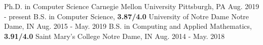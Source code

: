 \begin{cventries}
  \education
    {Ph.D. in Computer Science}
    {Carnegie Mellon University}
    {Pittsburgh, PA}
    {Aug. 2019 - present}
  \education
    {B.S. in Computer Science, \textbf{3.87/4.0}}
    {University of Notre Dame}
    {Notre Dame, IN}
    {Aug. 2015 - May. 2019}
  \education
    {B.S. in Computing and Applied Mathematics, \textbf{3.91/4.0}}
    {Saint Mary's College}
    {Notre Dame, IN}
    {Aug. 2014 - May. 2018}
\end{cventries}
